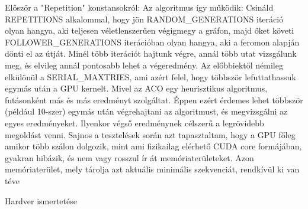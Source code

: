 Először a "Repetition" konstansokról: Az algoritmus így működik: Csináld REPETITIONS alkalommal, hogy jön RANDOM\_GENERATIONS iteráció olyan hangya, aki teljesen véletlenszerűen végigmegy a gráfon, majd őket követi FOLLOWER\_GENERATIONS iterációban olyan hangya, aki a feromon alapján dönti el az útját. Minél több iterációt hajtunk végre, annál több utat vizsgálunk meg, és elvileg annál pontosabb lehet a végeredmény.
Az előbbiektől némileg elkülönül a SERIAL\_MAXTRIES, ami azért felel, hogy többször lefuttathassuk egymás után a GPU kernelt. Mivel az ACO egy heurisztikus algoritmus, futásonként más és más eredményt szolgáltat. Éppen ezért érdemes lehet többször (például 10-szer) egymás után végrehajtani az algoritmust, és megvizsgálni az egyes eredményeket. Ilyenkor végső eredménynek célszerű a legrövidebb megoldást venni. Sajnos a tesztelések során azt tapasztaltam, hogy a GPU főleg amikor több szálon dolgozik, mint ami fizikailag elérhető CUDA core formájában, gyakran hibázik, és nem vagy rosszul ír át memóriaterületeket. Azon memóriaterület, mely tárolja azt aktuális minimális szekvenciát, rendkívül ki van téve 

Hardver ismertetése



